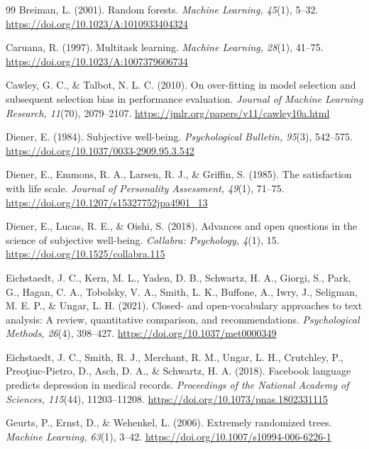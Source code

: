 \begin{thebibliography}{99}
Breiman, L. (2001). Random forests. \emph{Machine Learning, 45}(1), 5--32. \url{https://doi.org/10.1023/A:1010933404324}

Caruana, R. (1997). Multitask learning. \emph{Machine Learning, 28}(1), 41--75. \url{https://doi.org/10.1023/A:1007379606734}

Cawley, G. C., \& Talbot, N. L. C. (2010). On over-fitting in model selection and subsequent selection bias in performance evaluation. \emph{Journal of Machine Learning Research, 11}(70), 2079--2107. \url{https://jmlr.org/papers/v11/cawley10a.html}

Diener, E. (1984). Subjective well-being. \emph{Psychological Bulletin, 95}(3), 542--575. \url{https://doi.org/10.1037/0033-2909.95.3.542}

Diener, E., Emmons, R. A., Larsen, R. J., \& Griffin, S. (1985). The satisfaction with life scale. \emph{Journal of Personality Assessment, 49}(1), 71--75. \url{https://doi.org/10.1207/s15327752jpa4901_13}

Diener, E., Lucas, R. E., \& Oishi, S. (2018). Advances and open questions in the science of subjective well-being. \emph{Collabra: Psychology, 4}(1), 15. \url{https://doi.org/10.1525/collabra.115}

Eichstaedt, J. C., Kern, M. L., Yaden, D. B., Schwartz, H. A., Giorgi, S., Park, G., Hagan, C. A., Tobolsky, V. A., Smith, L. K., Buffone, A., Iwry, J., Seligman, M. E. P., \& Ungar, L. H. (2021). Closed- and open-vocabulary approaches to text analysis: A review, quantitative comparison, and recommendations. \emph{Psychological Methods, 26}(4), 398--427. \url{https://doi.org/10.1037/met0000349}

Eichstaedt, J. C., Smith, R. J., Merchant, R. M., Ungar, L. H., Crutchley, P., Preoţiuc-Pietro, D., Asch, D. A., \& Schwartz, H. A. (2018). Facebook language predicts depression in medical records. \emph{Proceedings of the National Academy of Sciences, 115}(44), 11203--11208. \url{https://doi.org/10.1073/pnas.1802331115}

Geurts, P., Ernst, D., \& Wehenkel, L. (2006). Extremely randomized trees. \emph{Machine Learning, 63}(1), 3--42. \url{https://doi.org/10.1007/s10994-006-6226-1}


\end{thebibliography}
